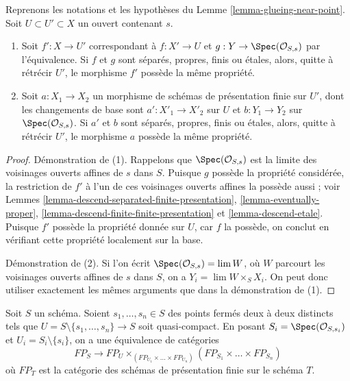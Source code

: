 \begin{lemma}
\label{lemma-glueing-near-point-properties}
Reprenons les notations et les hypothèses du Lemme \ref{lemma-glueing-near-point}.
Soit $U \subset U' \subset X$ un ouvert contenant $s$.
\begin{enumerate}
\item Soit $f' : X \to U'$ correspondant à $f : X' \to U$ et
$g : Y \to \Spec(\mathcal{O}_{S, s})$
par l'équivalence. Si $f$ et $g$ sont séparés, propres, finis ou étales,
alors, quitte à rétrécir $U'$, le morphisme $f'$ possède la même propriété.
\item Soit $a : X_1 \to X_2$
un morphisme de schémas de présentation finie sur $U'$,
dont les changements de base sont $a' : X'_1 \to X'_2$ sur $U$ et
$b : Y_1 \to Y_2$ sur $\Spec(\mathcal{O}_{S, s})$.
Si $a'$ et $b$ sont séparés, propres, finis ou étales,
alors, quitte à rétrécir $U'$, le morphisme $a$ possède la même propriété.
\end{enumerate}
\end{lemma}

\begin{proof}
Démonstration de (1). Rappelons que $\Spec(\mathcal{O}_{S, s})$ est la limite des
voisinages ouverts affines de $s$ dans $S$. Puisque $g$ possède la propriété
considérée, la restriction de $f'$ à l'un de ces
voisinages ouverts affines la possède aussi ; voir
Lemmes \ref{lemma-descend-separated-finite-presentation},
\ref{lemma-eventually-proper},
\ref{lemma-descend-finite-finite-presentation} et
\ref{lemma-descend-etale}.
Puisque $f'$ possède la propriété donnée sur $U$, car $f$ la possède,
on conclut en vérifiant cette propriété localement sur la base.

\medskip\noindent
Démonstration de (2). Si l'on écrit $\Spec(\mathcal{O}_{S, s}) = \lim W$,
où $W$ parcourt les voisinages ouverts affines de $s$ dans $S$,
on a $Y_i = \lim W \times_S X_i$. On peut donc utiliser
exactement les mêmes arguments que dans la démonstration de (1).
\end{proof}

\begin{lemma}
\label{lemma-glueing-near-multiple-closed-points}
Soit $S$ un schéma. Soient $s_1, \ldots, s_n \in S$ des points fermés
deux à deux distincts tels que
$U = S \setminus \{s_1, \ldots, s_n\} \to S$ soit quasi-compact. En posant
$S_i = \Spec(\mathcal{O}_{S, s_i})$ et $U_i = S_i \setminus \{s_i\}$,
on a une équivalence de catégories
$$
FP_S \longrightarrow
FP_U \times_{(FP_{U_1} \times \ldots \times FP_{U_n})}
(FP_{S_1} \times \ldots \times FP_{S_n})
$$
où $FP_T$ est la catégorie des schémas de présentation finie sur
le schéma $T$.
\end{lemma}

